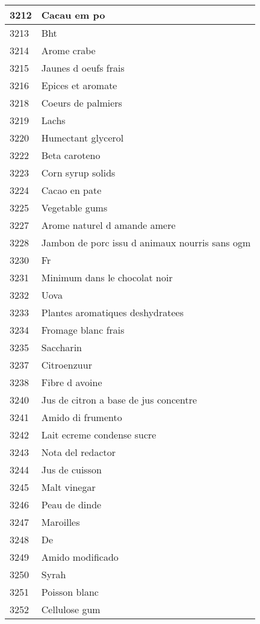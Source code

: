 \begin{longtable}{|l|l|}
3212 & Cacau em po \\ \hline 
3213 & Bht \\ \hline 
3214 & Arome crabe \\ \hline 
3215 & Jaunes d oeufs frais \\ \hline 
3216 & Epices et aromate \\ \hline 
3218 & Coeurs de palmiers \\ \hline 
3219 & Lachs \\ \hline 
3220 & Humectant glycerol \\ \hline 
3222 & Beta caroteno \\ \hline 
3223 & Corn syrup solids \\ \hline 
3224 & Cacao en pate \\ \hline 
3225 & Vegetable gums \\ \hline 
3227 & Arome naturel d amande amere \\ \hline 
3228 & Jambon de porc issu d animaux nourris sans ogm \\ \hline 
3230 & Fr \\ \hline 
3231 & Minimum dans le chocolat noir \\ \hline 
3232 & Uova \\ \hline 
3233 & Plantes aromatiques deshydratees \\ \hline 
3234 & Fromage blanc frais \\ \hline 
3235 & Saccharin \\ \hline 
3237 & Citroenzuur \\ \hline 
3238 & Fibre d avoine \\ \hline 
3240 & Jus de citron a base de jus concentre \\ \hline 
3241 & Amido di frumento \\ \hline 
3242 & Lait ecreme condense sucre \\ \hline 
3243 & Nota del redactor \\ \hline 
3244 & Jus de cuisson \\ \hline 
3245 & Malt vinegar \\ \hline 
3246 & Peau de dinde \\ \hline 
3247 & Maroilles \\ \hline 
3248 & De \\ \hline 
3249 & Amido modificado \\ \hline 
3250 & Syrah \\ \hline 
3251 & Poisson blanc \\ \hline 
3252 & Cellulose gum \\ \hline 

\end{longtable}
